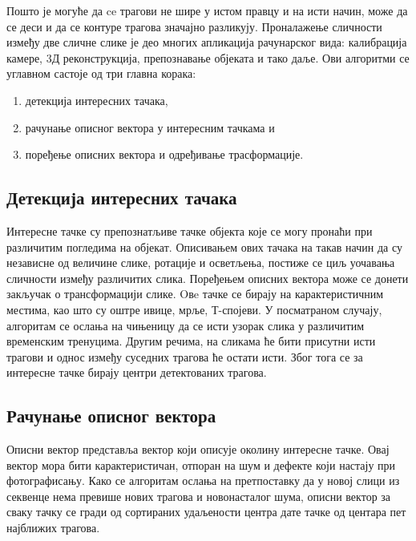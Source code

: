 \documentclass[11pt,a4paper,serbian,oneside]{book}
\begin{document}
Пошто је могуће да ce трагови не шире у истом правцу и на исти начин, може да се деси и да се контуре трагова значајно разликују. Проналажење сличности између две сличне слике је део многих апликација рачунарског вида: калибрација камере, 3Д реконструкција, препознавање објеката и тако даље. Ови алгоритми се  углавном састоје од три главна корака:
\begin{enumerate}
  \item детекција интересних тачака,
  \item рачунање описног вектора у интересним тачкама и
  \item поређење описних вектора и одређивање трасформације.
\end{enumerate}

\subsection{Детекција интересних тачака}
Интересне тачке су препознатљиве тачке објекта које се могу пронаћи при различитим погледима на објекат. Описивањем ових тачака на такав начин да су независне од величине слике, ротације и осветљења, постиже се циљ уочавања сличности између различитих слика. Поређењем описних вектора може се донети закључак о трансформацији слике. Oвe тачке  се бирају на карактеристичним местима, као што су оштре ивице, мрље, Т-спојеви. 
У посматраном случају, алгоритам се ослања на чињеницу да се исти узорак слика у различитим временским тренуцима. Другим речима, на сликама ће бити присутни исти трагови и однос између суседних трагова ће остати исти. Због тога се за интересне тачке бирају центри детектованих трагова.

\subsection{Рачунање описног вектора}

Описни вектор представља вектор који описује околину интересне тачке. Овај вектор мора бити карактеристичан, отпоран на шум и дефекте који настају при фотографисању. Како се алгоритам ослања на претпоставку да у новој слици из секвенце нема превише нових трагова и новонасталог шума, описни вектор за сваку тачку се гради од сортираних удаљености центра дате тачке од центара пет најближих трагова.
\end{document}
